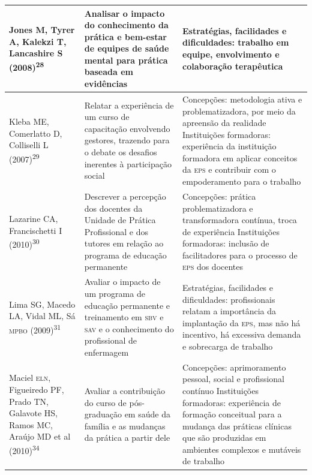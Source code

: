 \documentclass{article}
\begin{document}
\begin{table}
\begin{xtabular}{ l | l | l }
Jones M, Tyrer A, Kalekzi T, Lancashire S (2008)\textsuperscript{28}

& Analisar o impacto do conhecimento da prática e bem-estar de equipes de saúde
mental para prática baseada em evidências
& Estratégias, facilidades e dificuldades: trabalho em equipe, envolvimento e
colaboração terapêutica
\\ \hline

Kleba ME, Comerlatto D, Colliselli L (2007)\textsuperscript{29}

& Relatar a experiência de um curso de capacitação envolvendo gestores, trazendo
para o debate os desafios inerentes à participação social
& Concepções: metodologia ativa e problematizadora, por meio da apreensão da
realidade Instituições formadoras: experiência da instituição formadora em
aplicar conceitos da \textsc{eps} e contribuir com o empoderamento para o trabalho
\\ \hline

Lazarine CA, Francischetti I (2010)\textsuperscript{30}

& Descrever a percepção dos docentes da Unidade de Prática Profissional e dos
tutores em relação ao programa de educação permanente
& Concepções: prática problematizadora e transformadora contínua, troca de
experiência Instituições formadoras: inclusão de facilitadores para o processo
de \textsc{eps} dos docentes
\\ \hline

Lima SG, Macedo LA, Vidal ML, Sá \textsc{mpbo} (2009)\textsuperscript{31}

& Avaliar o impacto de um programa de educação permanente e treinamento em \textsc{sbv} e
\textsc{sav} e o conhecimento do profissional de enfermagem
& Estratégias, facilidades e dificuldades: profissionais relatam a importância
da implantação da \textsc{eps}, mas não há incentivo, há excessiva demanda e sobrecarga
de trabalho
\\ \hline

Maciel \textsc{eln}, Figueiredo PF, Prado TN, Galavote HS, Ramos MC, Araújo MD et al
(2010)\textsuperscript{34}

& Avaliar a contribuição do curso de pós-graduação em saúde da família e as
mudanças da prática a partir dele
& Concepções: aprimoramento pessoal, social e profissional contínuo Instituições
formadoras: experiência de formação conceitual para a mudança das práticas
clínicas que são produzidas em ambientes complexos e mutáveis de trabalho
\\ \hline


\end{xtabular}
\end{table}
\end{document}
